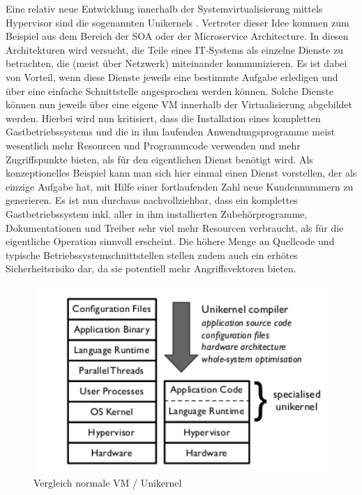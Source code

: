 Eine relativ neue Entwicklung innerhalb der Systemvirtualisierung mittels Hypervisor sind die sogenannten Unikernels \citep[Vgl.][Abstract und Introduction]{MadMorAnd13}. Vertreter dieser Idee kommen zum Beispiel aus dem Bereich der \ac{SOA} oder der Microservice Architecture. In diesen Architekturen wird versucht, die Teile eines IT-Systems als einzelne Dienste zu betrachten, die (meist über Netzwerk) miteinander kommunizieren. Es ist dabei von Vorteil, wenn diese Dienste jeweils eine bestimmte Aufgabe erledigen und über eine einfache Schnittstelle angesprochen werden können. Solche Dienste können nun jeweils über eine eigene \ac{VM} innerhalb der Virtualisierung abgebildet werden. Hierbei wird nun kritisiert, dass die Installation eines kompletten Gastbetriebssystems und die in ihm laufenden Anwendungsprogramme meist wesentlich mehr Resourcen und Programmcode verwenden und mehr Zugriffspunkte bieten, als für den eigentlichen Dienst benötigt wird. Als konzeptionelles Beispiel kann man sich hier einmal einen Dienst vorstellen, der als einzige Aufgabe hat, mit Hilfe einer fortlaufenden Zahl neue Kundennummern zu generieren. Es ist nun durchaus nachvollziehbar, dass ein komplettes Gastbetriebssystem inkl. aller in ihm installierten Zubehörprogramme, Dokumentationen und Treiber sehr viel mehr Resourcen verbraucht, als für die eigentliche Operation sinnvoll erscheint. Die höhere Menge an Quellcode und typische Betriebssystemschnittstellen stellen zudem auch ein erhötes Sicherheitsrisiko dar, da sie potentiell mehr Angriffsvektoren bieten.

\begin{figure}[!ht]
  \begin{center}
    \includegraphics[width=12cm]{bilder/comparison-vm-unikernel.png}
    \caption{Vergleich normale VM / Unikernel \citep[Abb. 1]{MadMorAnd13}}
  \end{center}
\end{figure}

